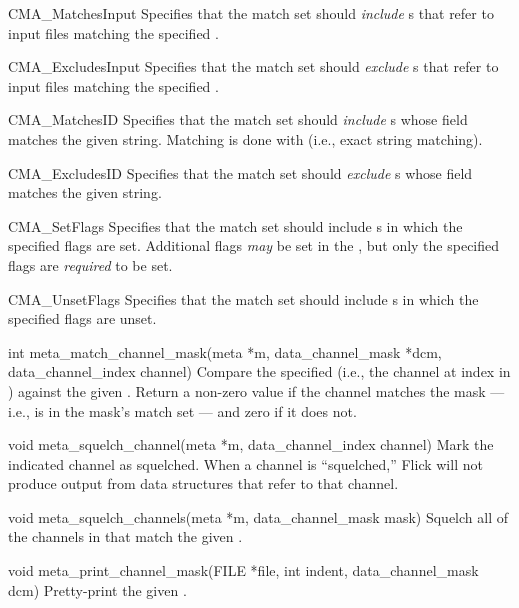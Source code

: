 \begin{cprototypelist}
\begin{cidentifierlist}
    \item[CMA_MatchesInput]
     Specifies that the match set should
    \emph{include} s that refer to input files matching the
    specified .

    \item[CMA_ExcludesInput]
     Specifies that the match set should
    \emph{exclude} s that refer to input files matching the
    specified .

    \item[CMA_MatchesID]
     Specifies that the match set should \emph{include}
    s whose  field matches the given
    string.  Matching is done with  (i.e., exact string
    matching).

    \item[CMA_ExcludesID]
     Specifies that the match set should \emph{exclude}
    s whose  field matches the given
    string.

    \item[CMA_SetFlags]
     Specifies that the match set should include
    s in which the specified flags are set.  Additional
    flags \emph{may} be set in the , but only the specified
    flags are \emph{required} to be set.

    \item[CMA_UnsetFlags]
     Specifies that the match set should include
    s in which the specified flags are unset.
  \end{cidentifierlist}

  \item[int meta_match_channel_mask(meta *m, data_channel_mask *dcm,
                                    data_channel_index channel)]
  Compare the specified  (i.e., the channel at index
   in ) against the given
  .  Return a non-zero value if the channel matches
  the mask --- i.e., is in the mask's match set --- and zero if it does not.

  \item[void meta_squelch_channel(meta *m, data_channel_index channel)]
  Mark the indicated channel as squelched.  When a channel is ``squelched,''
  Flick will not produce output from data structures that refer to that
  channel.

  \item[void meta_squelch_channels(meta *m, data_channel_mask mask)]
  Squelch all of the channels in  that match the given
  .

  \item[void meta_print_channel_mask(FILE *file, int indent,
                                     data_channel_mask dcm)]
  Pretty-print the given .
\end{cprototypelist}

